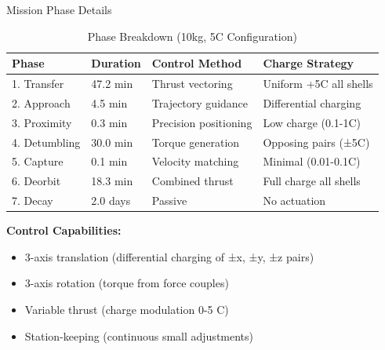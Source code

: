 \documentclass[aspectratio=169]{beamer}
\begin{document}
\begin{frame}{Mission Phase Details}
\begin{table}
\centering
\caption{Phase Breakdown (10kg, 5C Configuration)}
\scriptsize
\begin{tabular}{llll}
\toprule
\textbf{Phase} & \textbf{Duration} & \textbf{Control Method} & \textbf{Charge Strategy} \\
\midrule
1. Transfer & 47.2 min & Thrust vectoring & Uniform +5C all shells \\
2. Approach & 4.5 min & Trajectory guidance & Differential charging \\
3. Proximity & 0.3 min & Precision positioning & Low charge (0.1-1C) \\
4. Detumbling & 30.0 min & Torque generation & Opposing pairs (±5C) \\
5. Capture & 0.1 min & Velocity matching & Minimal (0.01-0.1C) \\
6. Deorbit & 18.3 min & Combined thrust & Full charge all shells \\
7. Decay & 2.0 days & Passive & No actuation \\
\bottomrule
\end{tabular}
\end{table}

\vspace{0.3cm}

\textbf{Control Capabilities:}
\begin{itemize}
    \item 3-axis translation (differential charging of ±x, ±y, ±z pairs)
    \item 3-axis rotation (torque from force couples)
    \item Variable thrust (charge modulation 0-5 C)
    \item Station-keeping (continuous small adjustments)
\end{itemize}
\end{frame}
\end{document}
